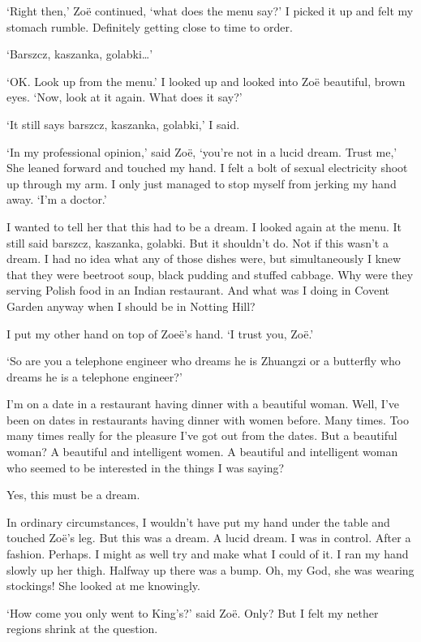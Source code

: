 `Right then,' Zoë continued, `what does the menu say?' I picked it
up and felt my stomach rumble. Definitely getting close to time to order.

`Barszcz, kaszanka, golabki\dots'

`OK. Look up from the menu.' I looked up and looked into Zoë beautiful, brown
eyes. `Now, look at it again. What does it say?'

`It still says barszcz, kaszanka, golabki,' I said.

`In my professional opinion,' said Zoë, `you're not in a lucid
dream. Trust me,' She leaned forward and touched my hand. I felt a
bolt of sexual electricity shoot up through my arm. I only just
managed to stop myself from jerking my hand away. `I'm a doctor.'

I wanted to tell her that this had to be a dream. I looked again at
the menu. It still said barszcz, kaszanka, golabki. But it shouldn't
do. Not if this wasn't a dream. I had no idea what any of those
dishes were, but simultaneously I knew that they were beetroot soup,
black pudding and stuffed cabbage. Why were they serving Polish food
in an Indian restaurant. And what was I doing in Covent Garden
anyway when I should be in Notting Hill?

I put my other hand on top of Zoeë's hand. `I trust you, Zoë.'

`So are you a telephone engineer who dreams he is Zhuangzi or a
butterfly who dreams he is a telephone engineer?'

I'm on a date in a restaurant having dinner with a beautiful woman.
Well, I've been on dates in restaurants having dinner with women
before. Many times. Too many times really for the pleasure
I've got out from the dates. But a {\twelveit beautiful\/} woman? A
beautiful and intelligent women. A beautiful and intelligent woman
who seemed to be interested in the things I was saying?

Yes, this must be a dream.

In ordinary circumstances, I wouldn't have put my hand under the
table and touched Zoë's leg. But this was a dream. A {\twelveit
lucid\/} dream. I was in control. After a fashion. Perhaps. I might
as well try and make what I could of it. I ran my hand slowly up her
thigh. Halfway up there was a bump. Oh, my God, she was wearing
stockings! She looked at me knowingly.

`How come you only went to King's?' said Zoë. Only? But I felt my nether
regions shrink at the question.

